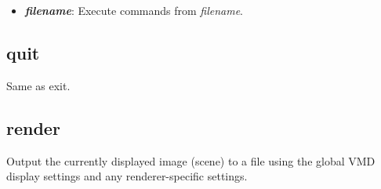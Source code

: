   \begin{itemize}
    \item {\bf  {\it filename}}: Execute commands from {\it filename}.
  \end{itemize}


  \subsection{quit}
Same as exit.




  \subsection{render}
Output the currently displayed image (scene) to a file using
the global VMD display settings and any renderer-specific settings.


